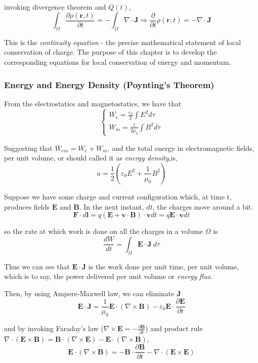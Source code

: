\documentclass[UTF8]{book}
\begin{document}
invoking divergence theorem and $Q(t)$,
\[\int _{\Omega }\frac{\partial \rho (\mathbf{r},t)}{\partial t}=-\int _{\Omega }\nabla \cdot \mathbf{J}\Rightarrow \frac{\partial }{\partial t}\rho (\mathbf{r},t)=-\nabla \cdot \mathbf{J}\]

This is the \emph{continuity equation} - the precise mathematical statement of local conservation of charge. The purpose of this chapter is to develop the corresponding equations for local conservation of energy and momentum.
\subsubsection{Energy and Energy Density (Poynting's Theorem)}
From the electrostatics and magnetostatics, we have that
\[\begin{cases}
W_e=\frac{\varepsilon _0}{2}\displaystyle\int E^2d\tau\\
W_m=\frac{1}{2\mu _0}\displaystyle\int B^2d\tau
\end{cases}\]

Suggesting that $W_{em}=W_e+W_m$, and the total energy in electromagnetic fields, per unit volume, or should called it as \emph{energy density},is,
\[u=\frac{1}{2}\left(\varepsilon _0E^2+\frac{1}{\mu_0}B^2\right)\]

Suppose we have some charge and current configuration which, at time t, produces fields $\mathbf{E}$ and $\mathbf{B}$. In the next instant, $dt$, the charges move around a bit.
\[\mathbf{F}\cdot d\mathbf{l}=q(\mathbf{E}+\mathbf{v}\cdot \mathbf{B})\cdot \mathbf{v}dt=q\mathbf{E}\cdot \mathbf{v}dt\]

so the rate at which work is done on all the charges in a volume $\Omega $ is
\[\frac{dW}{dt}=\int _{\Omega }\mathbf{E}\cdot \mathbf{J}\ d\tau \]

Thus we can see that $\mathbf{E}\cdot \mathbf{J}$ is the work done per unit time, per unit volume, which is to say, the power delivered per unit volume or \emph{energy flux}. 

Then, by using Ampere-Maxwell law, we can eliminate $\mathbf{J}$
\[\mathbf{E}\cdot \mathbf{J}=\frac{1}{\mu_0}\mathbf{E}\cdot (\nabla \times \mathbf{B})-\varepsilon_0\mathbf{E}\cdot \frac{\partial \mathbf{E}}{\partial t}\]

and by invoking Faraday's law ($\nabla \times \mathbf{E}=-\frac{\partial \mathbf{B}}{\partial t}$) and product rule $\nabla \cdot \left(\mathbf{E}\times \mathbf{B}\right)=\mathbf{B}\cdot \left(\nabla \times \mathbf{E}\right)-\mathbf{E}\cdot \left(\nabla \times \mathbf{B}\right)$,
\[\mathbf{E}\cdot (\nabla \times \mathbf{B})=-\mathbf{B}\cdot \frac{\partial \mathbf{B}}{\partial t}-\nabla \cdot (\mathbf{E}\times \mathbf{E})\]
\end{document}
